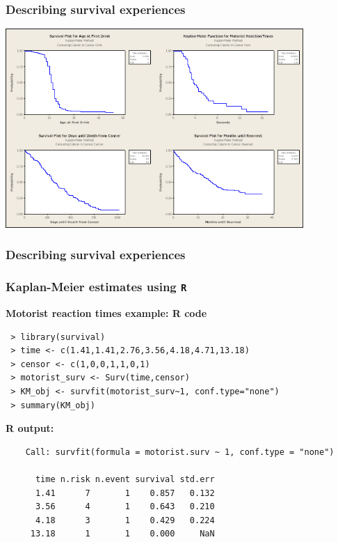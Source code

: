 \begin{frame}
\frametitle{Describing survival experiences}
\includegraphics[width=0.85\textwidth]{Figures/KM_four_datasets.jpg}
\end{frame}


\begin{frame}
\frametitle{Describing survival experiences}
\end{frame}

\begin{frame}[fragile]
\frametitle{Kaplan-Meier estimates using \texttt{R}}
\textbf{Motorist reaction times example: R code}
\begin{verbatim}
 > library(survival)
 > time <- c(1.41,1.41,2.76,3.56,4.18,4.71,13.18)
 > censor <- c(1,0,0,1,1,0,1)
 > motorist_surv <- Surv(time,censor)
 > KM_obj <- survfit(motorist_surv~1, conf.type="none")
 > summary(KM_obj)
\end{verbatim}
\vskip5pt
\textbf{R output:}
\begin{verbatim}
    Call: survfit(formula = motorist.surv ~ 1, conf.type = "none")

      time n.risk n.event survival std.err
      1.41      7       1    0.857   0.132
      3.56      4       1    0.643   0.210
      4.18      3       1    0.429   0.224
     13.18      1       1    0.000     NaN
\end{verbatim}
\end{frame}

